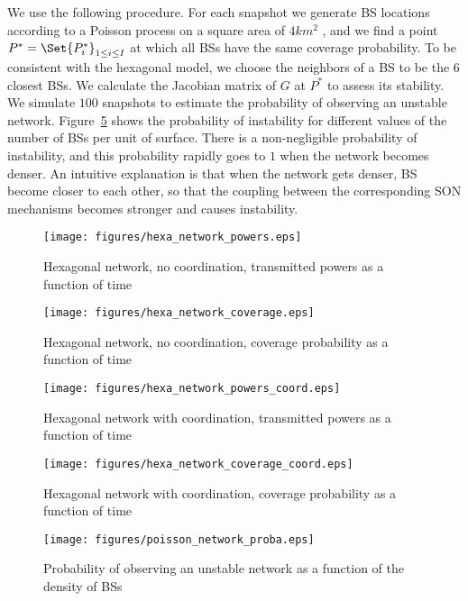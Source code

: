 \documentclass[10pt,conference,letterpaper]{IEEEtran}
\begin{document}
	We use the following procedure. For each snapshot we generate \ac{BS} locations according to a Poisson process on a square area of $4 km^2$ , and we find a point $P^* = \Set{P_i^*}_{1 \leq i \leq I}$ at which all \acp{BS} have the same coverage probability. To be consistent with the hexagonal model, we choose the neighbors of a \ac{BS} to be the $6$ closest \acp{BS}. We calculate the Jacobian matrix of $G$ at $P^*$ to assess its stability. We simulate $100$ snapshots to estimate the probability of observing an unstable network. Figure~\ref{fig:poisson_network_proba} shows the probability of instability for different values of the number of \acp{BS} per unit of surface. There is a non-negligible probability of instability, and this probability rapidly goes to $1$ when the network becomes denser. An intuitive explanation is that when the network gets denser, \ac{BS} become closer to each other, so that the coupling between the corresponding \ac{SON} mechanisms becomes stronger and causes instability. 
	\begin{figure}[htbp]
		\begin{center}
			\texttt{[image: figures/hexa\_network\_powers.eps]}
		\end{center}
		\caption{Hexagonal network, no coordination, transmitted powers as a function of time}
		\label{fig:hexa_network_powers}
	\end{figure}	
	\begin{figure}[htbp]
		\begin{center}
			\texttt{[image: figures/hexa\_network\_coverage.eps]}
		\end{center}
		\caption{Hexagonal network, no coordination, coverage probability as a function of time}
		\label{fig:hexa_network_coverage}
	\end{figure}
	\begin{figure}[htbp]
		\begin{center}
			\texttt{[image: figures/hexa\_network\_powers\_coord.eps]}
		\end{center}
		\caption{Hexagonal network with coordination, transmitted powers as a function of time}
		\label{fig:hexa_network_powers_coord}
	\end{figure}
	\begin{figure}[htbp]
		\begin{center}
			\texttt{[image: figures/hexa\_network\_coverage\_coord.eps]}
		\end{center}
		\caption{Hexagonal network with coordination, coverage probability as a function of time}
		\label{fig:hexa_network_coverage_coord}
	\end{figure}
	\begin{figure}[htbp]
		\begin{center}
			\texttt{[image: figures/poisson\_network\_proba.eps]}
		\end{center}
		\caption{Probability of observing an unstable network as a function of the density of BSs}
		\label{fig:poisson_network_proba}
	\end{figure}
\end{document}
